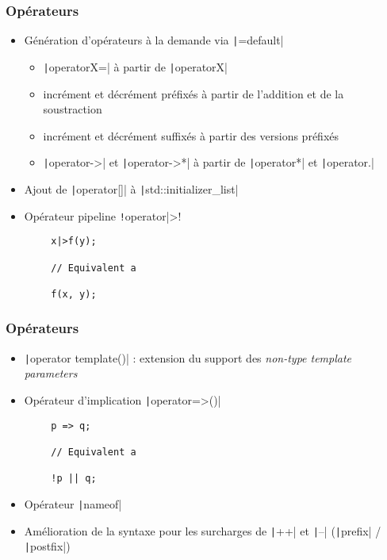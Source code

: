 \documentclass[C++.tex]{subfiles}
\begin{document}
\begin{frame}[fragile]
	\frametitle{Opérateurs}
	\begin{itemize}
		\item Génération d'opérateurs à la demande via \texttt|=default|
		\begin{itemize}
			\item \texttt|operatorX=| à partir de \texttt|operatorX|
			\item incrément et décrément préfixés à partir de l'addition et de la soustraction
			\item incrément et décrément suffixés à partir des versions préfixés
			\item \texttt|operator->| et \texttt|operator->*| à partir de \texttt|operator*| et \texttt|operator.|


		\end{itemize}
		\item Ajout de \texttt|operator[]| à \texttt|std::initializer_list|
		\item Opérateur pipeline \texttt!operator|>!
	\end{itemize}

	\begin{verbatim}
		x|>f(y);

		// Equivalent a

		f(x, y);
	\end{verbatim}

\end{frame}

\begin{frame}[fragile]
	\frametitle{Opérateurs}
	\begin{itemize}
		\item \texttt|operator template()| : extension du support des \textit{non-type template parameters}
		\item Opérateur d'implication \texttt|operator=>()|
	\end{itemize}

	\begin{verbatim}
		p => q;

		// Equivalent a

		!p || q;
	\end{verbatim}

	\begin{itemize}
		\item Opérateur \texttt|nameof|
		\item Amélioration de la syntaxe pour les surcharges de \texttt|++| et \texttt|--| (\texttt|prefix| / \texttt|postfix|)
	\end{itemize}

\end{frame}
\end{document}
